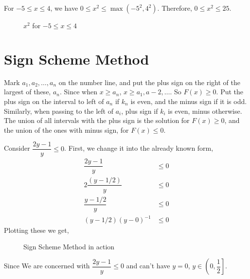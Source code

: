 \begin{example}
    For \(-5 \le x \le 4\), we have \( 0 \le x^2 \le \max(-5^2, 4^2)\). Therefore, \(0 \le 
    x^2 \le 25\).
\begin{figure}[H]
    \centering
    \caption{ {\color{red}\(x^2\)} for \(-5 \le x \le 4\)}
\end{figure}
\end{example}

\section{Sign Scheme Method}



\begin{enumerate}
    \ii Mark \(a_1,a_2,\dots,a_n\) on the number line, and put the plus sign on the right of the
    largest of these, \(a_n\). Since when \(x \ge a_n\), \(x \ge a_1, a-2, \dots\). So \(F(x) \ge 0\).
    \ii Put the plus sign on the interval to left of \(a_n\) if \(k_n\) is even, and the minus 
    sign if it is odd. Similarly, when passing to the left of \(a_i\), plus sign if \(k_i\)
    is even, minus otherwise.
    \ii The union of all intervals with the plus sign is the solution for \(F(x) \ge 0\), and
    the union of the ones with minus sign, for \(F(x) \le 0\). 
\end{enumerate}

\begin{example}
    Consider \(\dfrac{2y-1}{y} \le 0\). First, we change it into the already known form,
    \begin{align}
        \dfrac{2y-1}{y} &\le 0\\
        2\dfrac{(y-1/2)}{y} &\le 0\\
        \dfrac{y-1/2}{y} &\le 0\\
        (y-1/2)(y-0)^{-1} &\le 0
    \end{align}
    Plotting these we get,
    \begin{figure}[H]
        \centering
        \caption{Sign Scheme Method in action}
    \end{figure}

    Since We are concerned with \(\dfrac{2y-1}{y} \le 0\) and can't have \(y=0\),
    \(y \in \left(0,\dfrac{1}{2}\right]\).
\end{example}